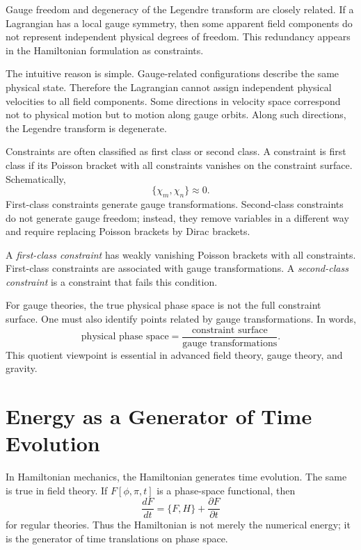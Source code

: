 Gauge freedom and degeneracy of the Legendre transform are closely related. If a
Lagrangian has a local gauge symmetry, then some apparent field components do
not represent independent physical degrees of freedom. This redundancy appears
in the Hamiltonian formulation as constraints.

The intuitive reason is simple. Gauge-related configurations describe the same
physical state. Therefore the Lagrangian cannot assign independent physical
velocities to all field components. Some directions in velocity space correspond
not to physical motion but to motion along gauge orbits. Along such directions,
the Legendre transform is degenerate.

Constraints are often classified as first class or second class. A constraint is
first class if its Poisson bracket with all constraints vanishes on the
constraint surface. Schematically,
\[
    \{\chi_m,\chi_n\}\approx0.
\]
First-class constraints generate gauge transformations. Second-class constraints
do not generate gauge freedom; instead, they remove variables in a different
way and require replacing Poisson brackets by Dirac brackets.

\begin{definitionbox}
A \emph{first-class constraint} has weakly vanishing Poisson brackets with all
constraints. First-class constraints are associated with gauge transformations.
A \emph{second-class constraint} is a constraint that fails this condition.
\end{definitionbox}

For gauge theories, the true physical phase space is not the full constraint
surface. One must also identify points related by gauge transformations. In
words,
\[
    \text{physical phase space}
    =\frac{\text{constraint surface}}{\text{gauge transformations}}.
\]
This quotient viewpoint is essential in advanced field theory, gauge theory,
and gravity.

\section{Energy as a Generator of Time Evolution}

In Hamiltonian mechanics, the Hamiltonian generates time evolution. The same is
true in field theory. If \(F[\phi,\pi,t]\) is a phase-space functional, then
\[
    \frac{dF}{dt}=\{F,H\}+\frac{\partial F}{\partial t}
\]
for regular theories. Thus the Hamiltonian is not merely the numerical energy;
it is the generator of time translations on phase space.

